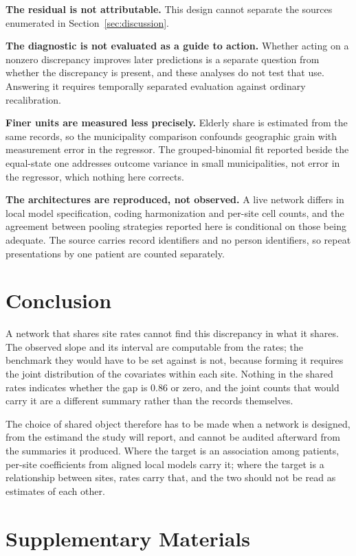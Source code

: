 \documentclass[11pt]{article}
\begin{document}
\textbf{The residual is not attributable.}  This design cannot
separate the sources enumerated in Section~\ref{sec:discussion}.

\textbf{The diagnostic is not evaluated as a guide to action.}
Whether acting on a nonzero discrepancy improves later predictions is a
separate question from whether the discrepancy is present, and these
analyses do not test that use.  Answering it requires temporally
separated evaluation against ordinary recalibration.

\textbf{Finer units are measured less precisely.}  Elderly share is
estimated from the same records, so the municipality comparison
confounds geographic grain with measurement error in the regressor.  The
grouped-binomial fit reported beside the equal-state one addresses
outcome variance in small municipalities, not error in the regressor,
which nothing here corrects.

\textbf{The architectures are reproduced, not observed.}  A live
network differs in local model specification, coding harmonization and
per-site cell counts, and the agreement between pooling strategies
reported here is conditional on those being adequate.  The source
carries record identifiers and no person identifiers, so repeat
presentations by one patient are counted separately.

\section{Conclusion}

A network that shares site rates cannot find this discrepancy in what it
shares.  The observed slope and its interval are computable from the
rates; the benchmark they would have to be set against is not, because
forming it requires the joint distribution of the covariates within
each site.  Nothing in the shared rates indicates whether the gap is
0.86 or zero, and the joint counts that would carry it are a different
summary rather than the records themselves.

The choice of shared object therefore has to be made when a network is
designed, from the estimand the study will report, and cannot be
audited afterward from the summaries it produced.  Where the target is
an association among patients, per-site coefficients from aligned local
models carry it; where the target is a relationship between sites,
rates carry that, and the two should not be read as estimates of each
other.

\section{Supplementary Materials}
\label{app:supplementary}
\end{document}
